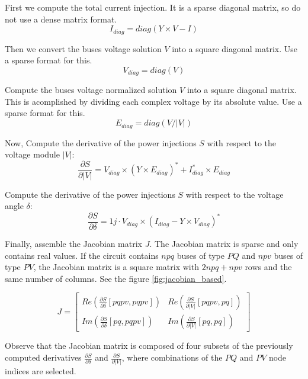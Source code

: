 \documentclass[a4paper,twoside,fleqn]{tufte-book}
\begin{document}
First we compute the total current injection. It is a sparse diagonal matrix, so do not use a dense matrix format.
\begin{equation}
I_{diag} = diag(Y \times V - I)
\end{equation}

Then we convert the buses voltage solution $V$ into a square diagonal matrix. Use a sparse format for this.
\begin{equation}
V_{diag} = diag(V)
\end{equation}

Compute the buses voltage normalized solution $V$ into a square diagonal matrix. This is acomplished by dividing each complex voltage by its absolute value. Use a sparse format for this.
\begin{equation}
E_{diag} = diag(V / |V|)
\end{equation}

Now, Compute the derivative of the power injections $S$ with respect to the voltage module $|V|$:
\begin{equation}
\frac{\partial S}{\partial |V|} = V_{diag} \times (Y \times E_{diag})^* + I_{diag}^* \times  E_{diag}
\end{equation}
    
Compute the derivative of the power injections $S$ with respect to the voltage angle $\delta$:
\begin{equation}
\frac{\partial S}{\partial \delta} = 1j \cdot V_{diag} \times (I_{diag} - Y \times V_{diag})^*
\end{equation}

Finally, assemble the Jacobian matrix $J$. The Jacobian matrix is sparse and only contains real values. If the circuit contains $npq$ buses of type $PQ$ and $npv$ buses of type $PV$, the Jacobian matrix is a square matrix with $2 npq + npv$ rows and the same number of columns. See the figure \ref{fig:jacobian_based}.

\begin{equation}
J=
\left[
\begin{array}{cc}
Re\left(\frac{\partial S}{\partial \delta}[pqpv, pqpv]\right) &
Re\left(\frac{\partial S}{\partial |V|}[pqpv, pq]\right) \\
Im\left(\frac{\partial S}{\partial \delta}[pq, pqpv]\right) &
Im\left(\frac{\partial S}{\partial |V|}[pq, pq]\right)
\end{array}
\right]
\end{equation}

Observe that the Jacobian matrix is composed of four subsets of the previously computed derivatives $\frac{\partial S}{\partial \delta}$ and $\frac{\partial S}{\partial |V|}$, where combinations of the $PQ$ and $PV$ node indices are selected.
\end{document}
